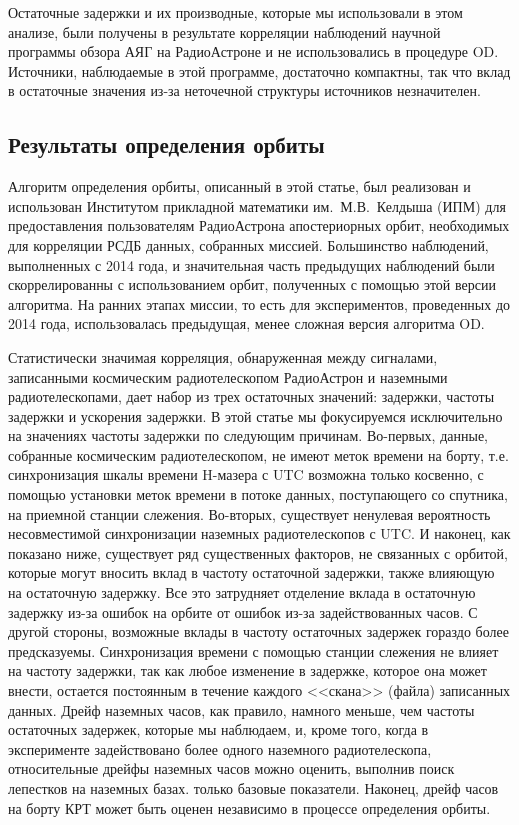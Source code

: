 Остаточные задержки и их производные, которые мы использовали в этом анализе, были получены в
результате корреляции наблюдений научной программы обзора АЯГ на РадиоАстроне и не использовались
в процедуре OD. Источники, наблюдаемые в этой программе, достаточно компактны, так что вклад в
остаточные значения из-за неточечной структуры источников незначителен.

\subsection{Результаты определения орбиты}

Алгоритм определения орбиты, описанный в этой статье, был реализован и использован Институтом
прикладной математики им.~М.В.~Келдыша (ИПМ) для предоставления пользователям РадиоАстрона
апостериорных орбит, необходимых для корреляции РСДБ данных, собранных миссией. Большинство
наблюдений, выполненных с 2014 года, и значительная часть предыдущих наблюдений были
скоррелированны с использованием орбит, полученных с помощью этой версии алгоритма. На ранних этапах
миссии, то есть для экспериментов, проведенных до 2014 года, использовалась предыдущая, менее
сложная версия алгоритма OD.

Статистически значимая корреляция, обнаруженная между сигналами, записанными космическим
радиотелескопом РадиоАстрон и наземными радиотелескопами, дает набор из трех остаточных значений:
задержки, частоты задержки и ускорения задержки. В этой статье мы фокусируемся исключительно на
значениях частоты задержки по следующим причинам. Во-первых, данные, собранные космическим
радиотелескопом, не имеют меток времени на борту, т.е. синхронизация шкалы времени H-мазера с UTC
возможна только косвенно, с помощью установки меток времени в потоке данных, поступающего со
спутника, на приемной станции слежения. Во-вторых, существует ненулевая вероятность несовместимой
синхронизации наземных радиотелескопов с UTC. И наконец, как показано ниже, существует ряд
существенных факторов, не связанных с орбитой, которые могут вносить вклад в частоту остаточной
задержки, также влияющую на остаточную задержку. Все это затрудняет отделение вклада в остаточную
задержку из-за ошибок на орбите от ошибок из-за задействованных часов. С другой стороны, возможные
вклады в частоту остаточных задержек гораздо более предсказуемы. Синхронизация времени с помощью
станции слежения не влияет на частоту задержки, так как любое изменение в задержке, которое она
может внести, остается постоянным в течение каждого <<скана>> (файла) записанных данных. Дрейф
наземных часов, как правило, намного меньше, чем частоты остаточных задержек, которые мы наблюдаем,
и, кроме того, когда в эксперименте задействовано более одного наземного радиотелескопа,
относительные дрейфы наземных часов можно оценить, выполнив поиск лепестков на наземных базах.
только базовые показатели. Наконец, дрейф часов на борту КРТ может быть оценен независимо в
процессе определения орбиты.

